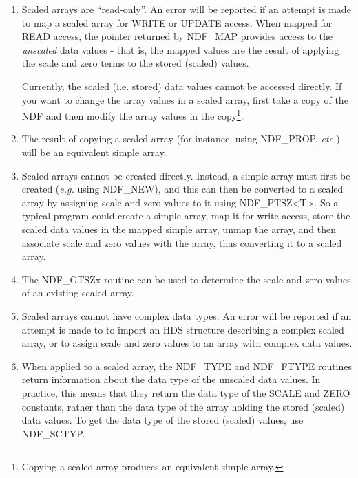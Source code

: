 \documentclass[twoside,11pt]{article}
\begin{document}
\begin{enumerate}

\item Scaled arrays are ``read-only''. An error will be reported if an
attempt is made to map a scaled array for WRITE or UPDATE access. When
mapped for READ access, the pointer returned by NDF\_MAP provides access
to the \emph{unscaled} data values - that is, the mapped values are the
result of applying the scale and zero terms to the stored (scaled) values.

Currently, the scaled (i.e. stored) data values cannot be accessed
directly. If you want to change the array values in a scaled array, first
take a copy of the NDF and then modify the array values in the
copy\footnote{Copying a scaled array produces an equivalent simple
array.}.

\item The result of copying a scaled array (for instance, using
NDF\_PROP, \emph{etc.}) will be an equivalent simple array.

\item Scaled arrays cannot be created directly. Instead, a simple array
must first be created (\emph{e.g.} using NDF\_NEW), and this can then be
converted to a scaled array by assigning scale and zero values to it
using NDF\_PTSZ<T>. So a typical program could create a simple array, map
it for write access, store the scaled data values in the mapped simple
array, unmap the array, and then associate scale and zero values with the
array, thus converting it to a scaled array.

\item The NDF\_GTSZx routine can be used to determine the scale and zero
values of an existing scaled array.

\item Scaled arrays cannot have complex data types. An error will be
reported if an attempt is made to to import an HDS structure describing a
complex scaled array, or to assign scale and zero values to an array with
complex data values.

\item When applied to a scaled array, the NDF\_TYPE and NDF\_FTYPE routines 
return information about the data type of the unscaled data values. In
practice, this means that they return the data type of the SCALE and ZERO
constants, rather than the data type of the array holding the stored
(scaled) data values. To get the data type of the stored (scaled) values,
use NDF\_SCTYP.

\end{enumerate}
\end{document}
